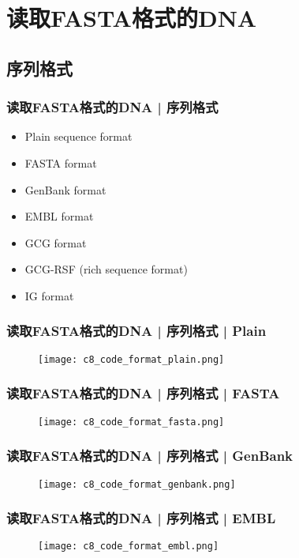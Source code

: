 \section{读取FASTA格式的DNA}
\subsection{序列格式}
\begin{frame}
  \frametitle{读取FASTA格式的DNA | 序列格式}
  \begin{itemize}
    \item Plain sequence format
    \item FASTA format
    \item GenBank format
    \item EMBL format
    \item GCG format
    \item GCG-RSF (rich sequence format)
    \item IG format
  \end{itemize}
\end{frame}

\begin{frame}
  \frametitle{读取FASTA格式的DNA | 序列格式 | \alert{Plain}}
  \begin{figure}
    \centering
    \texttt{[image: c8\_code\_format\_plain.png]}
  \end{figure}
\end{frame}

\begin{frame}
  \frametitle{读取FASTA格式的DNA | 序列格式 | \alert{FASTA}}
  \begin{figure}
    \centering
    \texttt{[image: c8\_code\_format\_fasta.png]}
  \end{figure}
\end{frame}

\begin{frame}
  \frametitle{读取FASTA格式的DNA | 序列格式 | \alert{GenBank}}
  \begin{figure}
    \centering
    \texttt{[image: c8\_code\_format\_genbank.png]}
  \end{figure}
\end{frame}

\begin{frame}
  \frametitle{读取FASTA格式的DNA | 序列格式 | \alert{EMBL}}
  \begin{figure}
    \centering
    \texttt{[image: c8\_code\_format\_embl.png]}
  \end{figure}
\end{frame}

